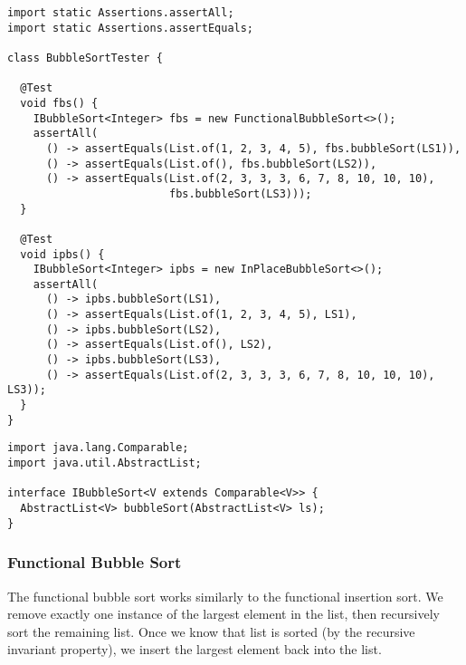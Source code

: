 \begin{lstlisting}[language=MyJava]
import static Assertions.assertAll;
import static Assertions.assertEquals;

class BubbleSortTester {

  @Test
  void fbs() {
    IBubbleSort<Integer> fbs = new FunctionalBubbleSort<>();
    assertAll(
      () -> assertEquals(List.of(1, 2, 3, 4, 5), fbs.bubbleSort(LS1)),
      () -> assertEquals(List.of(), fbs.bubbleSort(LS2)),
      () -> assertEquals(List.of(2, 3, 3, 3, 6, 7, 8, 10, 10, 10), 
                         fbs.bubbleSort(LS3)));
  }

  @Test
  void ipbs() {
    IBubbleSort<Integer> ipbs = new InPlaceBubbleSort<>();
    assertAll(
      () -> ipbs.bubbleSort(LS1),
      () -> assertEquals(List.of(1, 2, 3, 4, 5), LS1),
      () -> ipbs.bubbleSort(LS2),
      () -> assertEquals(List.of(), LS2),
      () -> ipbs.bubbleSort(LS3),
      () -> assertEquals(List.of(2, 3, 3, 3, 6, 7, 8, 10, 10, 10), LS3));
  }
}
\end{lstlisting}

\begin{lstlisting}[language=MyJava]
import java.lang.Comparable;
import java.util.AbstractList;

interface IBubbleSort<V extends Comparable<V>> {
  AbstractList<V> bubbleSort(AbstractList<V> ls);
}
\end{lstlisting}

\subsubsection*{Functional Bubble Sort}
The functional bubble sort works similarly to the functional insertion sort. We remove exactly one instance of the largest element in the list, then recursively sort the remaining list. Once we know that list is sorted (by the recursive invariant property), we insert the largest element back into the list.

